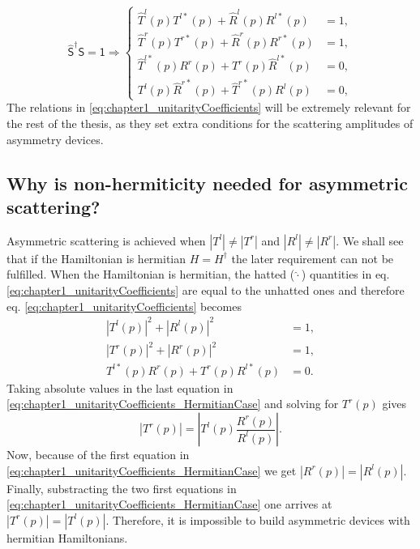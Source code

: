 %
\begin{equation}
  \mathsf{\widehat{S}}^\dagger\mathsf{S} = \mathsf{1}
  \Longrightarrow
  \begin{cases}
    \widehat T^l(p) T^{l*}(p) + \widehat R^l(p) R^{l*}(p) &= 1,
    \\
    \widehat T^r(p) T^{r*}(p) + \widehat R^r(p) R^{r*}(p) &= 1,
    \\
    \widehat T^{l*}(p) R^r(p) + T^r(p) \widehat R^{l*}(p) &= 0,
    \\
    T^l(p) \widehat R^{r*}(p) + \widehat T^{r*}(p) R^l(p) &= 0,
  \end{cases}
  \label{eq:chapter1_unitarityCoefficients}
\end{equation}
%
The relations in \eqref{eq:chapter1_unitarityCoefficients} will be extremely relevant for the rest of the thesis, as they set extra conditions for the scattering amplitudes of asymmetry devices.

\subsection{Why is non-hermiticity needed for asymmetric scattering?}

Asymmetric scattering is achieved when $\left|T^l\right|\neq\left|T^r\right|$ and $\left|R^l\right|\neq\left|R^r\right|$. We shall see that if the Hamiltonian is hermitian $H = H^\dagger$ the later requirement can not be fulfilled. When the Hamiltonian is hermitian, the hatted ($\widehat{\cdot}$) quantities in eq. \eqref{eq:chapter1_unitarityCoefficients} are equal to the unhatted ones and therefore eq. \eqref{eq:chapter1_unitarityCoefficients} becomes
%
\begin{align}
  \left|T^l(p)\right|^2 +  \left|R^l(p)\right|^2  &= 1,\nonumber
  \\
  \left|T^r(p)\right|^2 +  \left|R^r(p)\right|^2  &= 1,\nonumber
  \\
   T^{l*}(p) R^r(p) + T^r(p)  R^{l*}(p) &= 0.
  \label{eq:chapter1_unitarityCoefficients_HermitianCase}
\end{align}
%
Taking absolute values in the last equation in \eqref{eq:chapter1_unitarityCoefficients_HermitianCase} and solving for $T^{r}(p)$ gives
%
\begin{equation}
  \left|T^r(p)\right|  = \left| T^{l}(p) \frac{R^r(p)}{R^{l}(p)} \right|.
\end{equation}
%
Now, because of the first equation in \eqref{eq:chapter1_unitarityCoefficients_HermitianCase} we get $\left|R^r(p)\right| = \left|R^l(p)\right|$. Finally, substracting the two first equations in \eqref{eq:chapter1_unitarityCoefficients_HermitianCase} one arrives at $\left|T^r(p)\right| = \left|T^l(p)\right|$. Therefore, it is impossible to build asymmetric devices with hermitian Hamiltonians.

